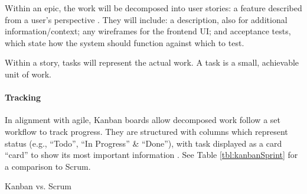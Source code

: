 Within an epic, the work will be decomposed into user
stories: a feature described from a user's perspective
\parencite{agile}.
They will include: a description, also for additional
information/context; any wireframes for the frontend UI;
and acceptance tests, which state how the system should
function against which to test.

Within a story, tasks will represent the actual work.
A task is a small, achievable unit of work.

\paragraph{Tracking}

In alignment with agile, Kanban boards allow decomposed
work follow a set workflow to track progress.
They are structured with columns which represent status
(e.g., \enquote{Todo}, \enquote{In Progress} \&
\enquote{Done}), with task displayed as a card
\enquote{card} to show its most important information
\parencite{kanban}.
See Table \ref{tbl:kanbanSprint} for a comparison to Scrum.

\begin{table}[h]
  \centering
  
  \caption{Kanban vs. Scrum}
  \parencite{kanban}
  \label{tbl:kanbanSprint}
\end{table}
